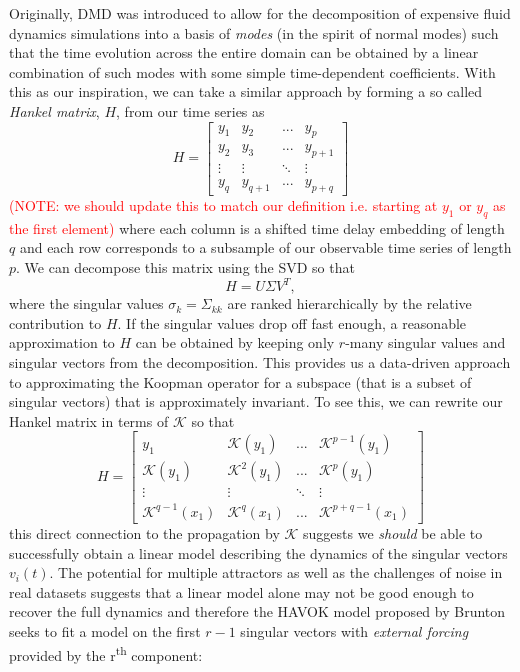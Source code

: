 Originally, DMD was introduced to allow for the decomposition of expensive fluid dynamics simulations into a basis of \textit{modes} (in the spirit of normal modes) such that the time evolution across the entire domain can be obtained by a linear combination of such modes with some simple time-dependent coefficients. With this as our inspiration, we can take a similar approach by forming a so called \textit{Hankel matrix}, $H$, from our time series as
\begin{equation}
  H = \begin{bmatrix}
    y_1 & y_2 & ... & y_p \\
    y_2 & y_3 & ... & y_{p+1} \\
    \vdots & \vdots & \ddots & \vdots \\
    y_q & y_{q+1} & ... & y_{p+q}
    \end{bmatrix}
\end{equation}
\textcolor{red}{(NOTE: we should update this to match our definition i.e. starting at $y_1$ or $y_q$ as the first element)} where each column is a shifted time delay embedding of length $q$ and each row corresponds to a subsample of our observable time series of length $p$. We can decompose this matrix using the SVD so that
\begin{equation}
  H = U\Sigma V^T,
\end{equation}
where the singular values $\sigma_k=\Sigma_{kk}$ are ranked hierarchically by the relative contribution to $H$. If the singular values drop off fast enough, a reasonable approximation to $H$ can be obtained by keeping only $r$-many singular values and singular vectors from the decomposition. This provides us a data-driven approach to approximating the Koopman operator for a subspace (that is a subset of singular vectors) that is approximately invariant. To see this, we can rewrite our Hankel matrix in terms of $\mathcal{K}$ so that
\begin{equation}
  H = \begin{bmatrix}
    y_1 & \mathcal{K}(y_1) & ... & \mathcal{K}^{p-1}(y_1) \\
    \mathcal{K}(y_1) & \mathcal{K}^2(y_1) & ... & \mathcal{K}^p(y_1) \\
    \vdots & \vdots & \ddots & \vdots \\
    \mathcal{K}^{q-1}(x_1) & \mathcal{K}^q(x_1) & ... & \mathcal{K}^{p+q-1}(x_1)
    \end{bmatrix}
\end{equation}
this direct connection to the propagation by $\mathcal{K}$ suggests we \textit{should} be able to successfully obtain a linear model describing the dynamics of the singular vectors $v_i(t)$. The potential for multiple attractors as well as the challenges of noise in real datasets suggests that a linear model alone may not be good enough to recover the full dynamics and therefore the HAVOK model proposed by Brunton seeks to fit a model on the first $r-1$ singular vectors with \textit{external forcing} provided by the r\textsuperscript{th} component:
